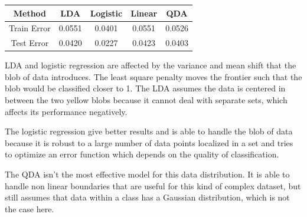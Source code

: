 \documentclass[9pt, oneside]{amsart}   	%
\begin{document}
\hfill
\begin{minipage}{.45\textwidth}
  \begin{table}[H]
   \centering
    \begin{tabular}{c|cccc}
    Method & LDA & Logistic & Linear & QDA \\
    \hline
    Train Error & 0.0551 & 0.0401 & 0.0551 & 0.0526 \\
    \hline
    Test Error & 0.0420 & 0.0227 & 0.0423 & 0.0403 \\
    \end{tabular}
\end{table}

 \end{minipage}\hfill
 \begin{minipage}{.45\textwidth}
 LDA and logistic regression are affected by the variance and mean shift that the blob of data introduces. The least square penalty moves the frontier such that the blob would be classified closer to 1.  The LDA assumes the data is centered in between the two yellow blobs because it cannot deal with separate sets, which affects its performance negatively.
 
 The logistic regression give better results and is able to handle the blob of data because it is robust to a large number of data points localized in a set and tries to optimize an error function which depends on the quality of classification. 
 
The QDA isn't the most effective model for this data distribution. It is able to handle non linear boundaries that are useful for this kind of complex dataset, but still assumes that data within a class has a Gaussian distribution, which is not the case here.
 \end{minipage}\hspace{1cm}



 
\end{document}
